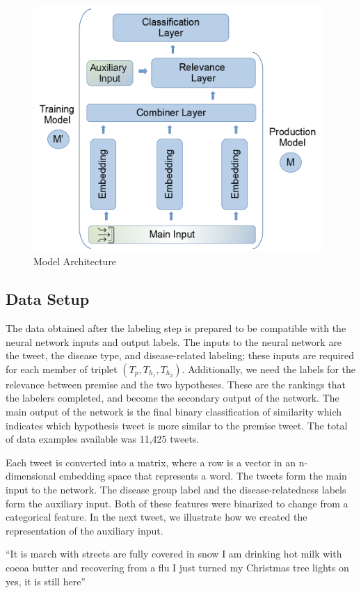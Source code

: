 \documentclass[12pt]{report}
\begin{document}
\begin{figure}[htbp]	
	\centering
	\includegraphics[width=110mm, scale = 1]{images/11_all_model.png}	
	\caption{Model Architecture}	
	\label{figure:all_model}
\end{figure}

\subsection{Data Setup \label{input_setup}}
The data obtained after the labeling step is prepared to be compatible with the neural network inputs and output labels. The inputs to the neural network are the tweet, the disease type, and disease-related labeling; these inputs are required for each member of triplet $(T_p, T_{h_1},T_{h_2})$. 
Additionally, we need the labels for the relevance between premise and the two hypotheses. These are the rankings that the labelers completed,  and become the secondary output of the network. The main output of the network is the  final binary classification of similarity which  indicates which hypothesis tweet is more similar to the premise tweet. 
 The total of data examples available was 11,425 tweets.

Each tweet is converted into a matrix, where a row is a vector in an n-dimensional embedding space that represents a word. The tweets form the 
main input to the network.
The disease group label and the disease-relatedness labels form the auxiliary input. Both of these features were binarized to change from a  categorical feature.
 In the next tweet,  we illustrate how we created the representation of the auxiliary input.

\begin{definition}
	``It is march with streets are fully covered in snow I am drinking hot milk with cocoa butter and recovering from a flu I just turned my Christmas tree lights on yes, it is still here''
\end{definition}
\end{document}

